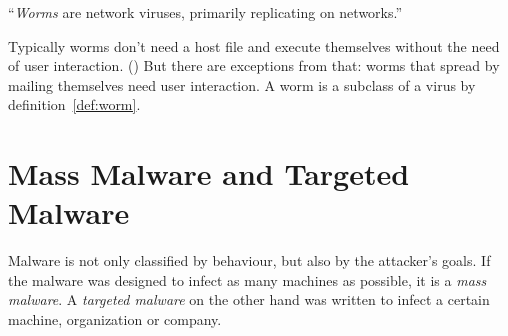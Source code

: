 \begin{definition}[Worm]
\enquote{\emph{Worms} are network viruses, primarily replicating on networks.} \cite[]{szor05} \label{def:worm}
\end{definition} 

Typically worms don't need a host file and execute themselves without the need of user interaction. (\cite[]{szor05}) But there are exceptions from that: \eg{} worms that spread by mailing themselves need user interaction.
A worm is a subclass of a virus by definition~\ref{def:worm}.

\section{Mass Malware and Targeted Malware}

Malware is not only classified by behaviour, but also by the attacker's goals. If the malware was designed to infect as many machines as possible, it is a \emph{mass malware}. A \emph{targeted malware} on the other hand was written to infect a certain machine, organization or company.
